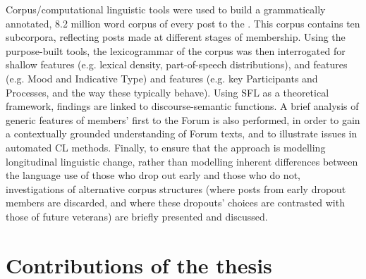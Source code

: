 Corpus\slash computational linguistic tools were used to build a grammatically annotated, 8.2 million word corpus of every post to the . This \gls{corpus} contains ten subcorpora, reflecting \glspl{post} made at different stages of membership. Using the purpose\hyp{}built tools, the \gls{lexicogrammar} of the corpus was then interrogated for shallow features (e.g. lexical density, part\hyp{}of\hyp{}speech distributions),  and  features (e.g. Mood and Indicative Type) and  features (e.g. key Participants and Processes, and the way these typically behave). Using \gls{SFL} as a theoretical framework,  findings are linked to \gls{discourse-semantic} functions. A brief analysis of generic features of \glspl{member}' first  to the \gls{Forum} is also performed, in order to gain a contextually grounded understanding of \gls{Forum} texts, and to illustrate issues in automated \gls{CL} methods. Finally, to ensure that the approach is modelling longitudinal linguistic change, rather than modelling inherent differences between the language use of those who drop out early and those who do not, investigations of alternative corpus structures (where posts from early dropout members are discarded, and where these dropouts' choices are contrasted with those of future veterans) are briefly presented and discussed.


\section{Contributions of the thesis}

